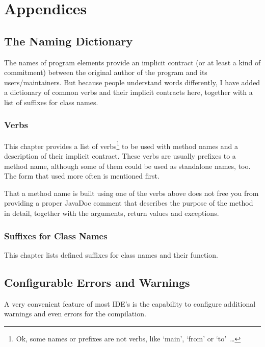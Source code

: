 \documentclass[11pt,a4paper, titlepage, parskip=half, headsepline, footsepline, cleardoublepage=current, headheight=1cm]{scrbook}
\begin{document}
\chapter{Appendices}\label{sec:Appendices}

\section{The Naming Dictionary}\label{sec:TheNamingDictionary}
The names of program elements provide an implicit contract (or at least a kind of commitment) between the original author of the program and its users/maintainers. But because people understand words differently, I have added a dictionary of common verbs and their implicit contracts here, together with a list of suffixes for class names.

\subsection{Verbs}
This chapter provides a list of verbs\footnote{Ok, some names or prefixes are not verbs, like ‘main’, ‘from’ or ‘to’~…} to be used with method names and a description of their implicit contract. These verbs are usually prefixes to a method name, although some of them could be used as standalone names, too. The form that used more often is mentioned first.

\renewcommand{\cellalign}{tl}

That a method name is built using one of the verbs above does not free you from providing a proper JavaDoc comment that describes the purpose of the method in detail, together with the arguments, return values and exceptions.

\subsection{Suffixes for Class Names}\label{sec:SuffixesForClassNames}
This chapter lists defined suffixes for class names and their function.

\renewcommand{\cellalign}{tl}

\section{Configurable Errors and Warnings}\label{sec:ConfigurableErrorsAndWarnings}
A very convenient feature of most IDE's is the capability to configure additional warnings and even errors for the compilation.
\end{document}
